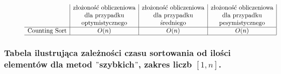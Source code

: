 \documentclass[polish,polish,a4paper]{article}
\begin{document}
\begin{spacing}{1.5}
\begin{figure}[H]
\begin{equation*}
\begin{array}{l|c|c|c|}
	&$złożoność obliczeniowa$&$złożoność obliczeniowa$&$złożoność obliczeniowa$\\
	&$dla przypadku$&$dla przypadku$&$dla przypadku$\\
	&$optymistycznego$&$średniego$&$pesymistycznego$\\
	\hline
	$Counting Sort$&O(n)&O(n)&O(n)\\
	\hline
	\end{array}
	\end{equation*}
\end{figure}

	\subsubsection*{Tabela ilustrująca zależności czasu sortowania od ilości elementów dla metod $"$szybkich$"$, zakres liczb $ [1,n] $.}

\begin{figure}[H]
	\begin{equation*}
	\begin{array}{l|c|c|c|c|}
	

\end{array}
\end{equation*}
\end{figure}
\end{spacing}
\end{document}
